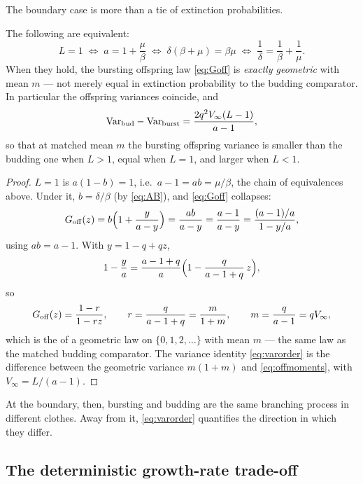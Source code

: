 The boundary case is more than a tie of extinction probabilities.

\begin{proposition}
\label{prop:L1}
The following are equivalent:
\begin{equation}
L=1
\;\Longleftrightarrow\;
a=1+\frac{\mu}{\beta}
\;\Longleftrightarrow\;
\delta(\beta+\mu)=\beta\mu
\;\Longleftrightarrow\;
\frac{1}{\delta}=\frac{1}{\beta}+\frac{1}{\mu}.
\end{equation}
When they hold, the bursting offspring law \eqref{eq:Goff} is
\emph{exactly geometric} with mean $m$ --- not merely equal in extinction
probability to the budding comparator. In particular the offspring
variances coincide, and
\begin{equation}
\mathrm{Var}_{\rm bud}-\mathrm{Var}_{\rm burst}
=\frac{2q^2V_\infty(L-1)}{a-1},
\label{eq:varorder}
\end{equation}
so that at matched mean $m$ the bursting offspring variance is smaller
than the budding one when $L>1$, equal when $L=1$, and larger when $L<1$.
\end{proposition}

\begin{proof}
$L=1$ is $a(1-b)=1$, i.e.\ $a-1=ab=\mu/\beta$, the chain of equivalences
above. Under it, $b=\delta/\beta$ (by \eqref{eq:AB}), and \eqref{eq:Goff}
collapses:
$$
G_{\rm off}(z)=b\Bigl(1+\frac{y}{a-y}\Bigr)=\frac{ab}{a-y}
=\frac{a-1}{a-y}
=\frac{(a-1)/a}{1-y/a},
$$
using $ab=a-1$. With $y=1-q+qz$,
$$
1-\frac{y}{a}=\frac{a-1+q}{a}\Bigl(1-\frac{q}{a-1+q}\,z\Bigr),
$$
so
$$
G_{\rm off}(z)=\frac{1-r}{1-rz},
\qquad
r=\frac{q}{a-1+q}=\frac{m}{1+m},
\qquad m=\frac{q}{a-1}=qV_\infty,
$$
which is the \pgf{} of a geometric law on $\{0,1,2,\ldots\}$ with mean $m$
--- the same law as the matched budding comparator. The variance identity
\eqref{eq:varorder} is the difference between the geometric variance
$m(1+m)$ and \eqref{eq:offmoments}, with $V_\infty=L/(a-1)$.
\end{proof}

At the boundary, then, bursting and budding are the same branching process
in different clothes. Away from it, \eqref{eq:varorder} quantifies the
direction in which they differ.

\subsection{The deterministic growth-rate trade-off}
\label{sec:r-tradeoff}

